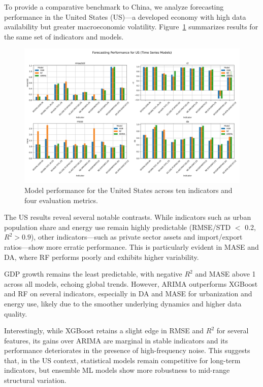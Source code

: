 \documentclass[12pt]{article}
\begin{document}
To provide a comparative benchmark to China, we analyze forecasting performance in the United States (US)—a developed economy with high data availability but greater macroeconomic volatility. Figure~\ref{fig:us_ts_metrics} summarizes results for the same set of indicators and models.

\begin{figure}[H]
    \centering
    \includegraphics[width=\textwidth]{us_case_comparison.png}
    \caption{Model performance for the United States across ten indicators and four evaluation metrics.}
    \label{fig:us_ts_metrics}
\end{figure}

The US results reveal several notable contrasts. While indicators such as urban population share and energy use remain highly predictable (RMSE/STD $<$ 0.2, $R^2 > 0.9$), other indicators—such as private sector assets and import/export ratios—show more erratic performance. This is particularly evident in MASE and DA, where RF performs poorly and exhibits higher variability.

GDP growth remains the least predictable, with negative $R^2$ and MASE above 1 across all models, echoing global trends. However, ARIMA outperforms XGBoost and RF on several indicators, especially in DA and MASE for urbanization and energy use, likely due to the smoother underlying dynamics and higher data quality.

Interestingly, while XGBoost retains a slight edge in RMSE and $R^2$ for several features, its gains over ARIMA are marginal in stable indicators and its performance deteriorates in the presence of high-frequency noise. This suggests that, in the US context, statistical models remain competitive for long-term indicators, but ensemble ML models show more robustness to mid-range structural variation.
\end{document}
